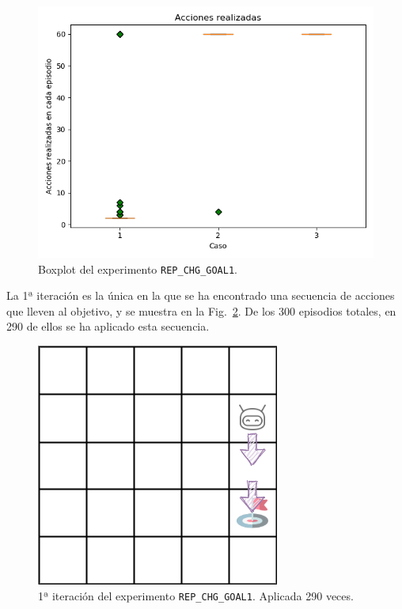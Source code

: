 \begin{figure}
    \centering
    \includegraphics[scale=0.4]{cap5_experimentacion/images/CHANGE_GOAL-20_09-21_30-0, 2, 1_boxplot.png}
    \caption{Boxplot del experimento \texttt{REP\_CHG\_GOAL1}.}
    \label{fig:CHANGE_GOAL-20_09-21_30-0, 2, 1_boxplot}
\end{figure}

La 1ª iteración es la única en la que se ha encontrado una secuencia de acciones que lleven al objetivo, y se muestra en la Fig.~\ref{fig:CHANGE_GOAL-20_09-21_30-0, 2, 1_it1_290}. De los 300 episodios totales, en 290 de ellos se ha aplicado esta secuencia. \\

\begin{figure}
    \centering
    \includegraphics[scale=0.4]{cap5_experimentacion/images/CHANGE_GOAL-20_09-21_30-0, 2, 1_it1_290.png}
    \caption{1ª iteración del experimento \texttt{REP\_CHG\_GOAL1}. Aplicada 290 veces.}
    \label{fig:CHANGE_GOAL-20_09-21_30-0, 2, 1_it1_290}
\end{figure}

